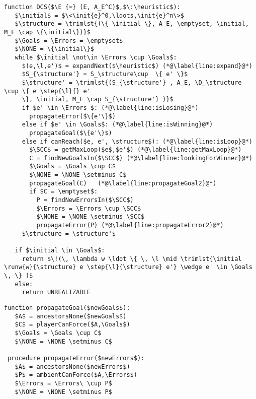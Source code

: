 \lstset{numbers=left, numberstyle=\tiny, stepnumber=1, numbersep=5pt}
\begin{lstlisting}[language={pseudocode},label={lst:dcs},caption={On-the-fly Directed Exploration Procedure.},float=ht]
 function DCS($\E {=} (E, A_E^C)$,$\:\heuristic$):
   $\initial$ = $\<\init{e}^0,\ldots,\init{e}^n\>$
   $\structure = \trimlst{(\{ \initial \}, A_E, \emptyset, \initial, M_E \cap \{\initial\})}$
   $\Goals = \Errors = \emptyset$
   $\NONE = \{\initial\}$
   while $\initial \not\in \Errors \cup \Goals$:
     $(e,\l,e')$ = expandNext($\heuristic$) (*@\label{line:expand}@*)
     $S_{\structure'} = S_\structure\cup  \{ e' \}$
     $\structure' = \trimlst{(S_{\structure'} , A_E, \D_\structure \cup \{ e \step{\l}{} e' 
     \}, \initial, M_E \cap S_{\structure'} )}$
     if $e' \in \Errors $: (*@\label{line:isLosing}@*)
       propagateError($\{e'\}$)
     else if $e' \in \Goals$: (*@\label{line:isWinning}@*)
       propagateGoal($\{e'\}$)
     else if canReach($e, e', \structure$): (*@\label{line:isLoop}@*)
       $\SCC$ = getMaxLoop($e$,$e'$) (*@\label{line:getMaxLoop}@*)
       C = findNewGoalsIn($\SCC$) (*@\label{line:lookingForWinner}@*)
       $\Goals = \Goals \cup C$
       $\NONE = \NONE \setminus C$
       propagateGoal(C)   (*@\label{line:propagateGoal2}@*)
       if $C = \emptyset$:
         P = findNewErrorsIn($\SCC$)
         $\Errors = \Errors \cup \SCC$
         $\NONE = \NONE \setminus \SCC$
         propagateError(P) (*@\label{line:propagateError2}@*)
     $\structure = \structure'$
 
   if $\initial \in \Goals$:
     return $\!(\, \lambda w \ldot \{ \, \l \mid \trimlst{\initial \runw{w}{\structure} e \step{\l}{\structure} e'} \wedge e' \in \Goals \, \} )$
   else:
     return UNREALIZABLE
\end{lstlisting}  

\lstset{numbers=none, numberstyle=\tiny, stepnumber=1, numbersep=5pt}
\begin{lstlisting}[language={pseudocode},label={lst:dcs.propagate},caption={Status propagation procedures.},float=ht]
 function propagateGoal($newGoals$):
   $A$ = ancestorsNone($newGoals$)
   $C$ = playerCanForce($A,\Goals$)
   $\Goals = \Goals \cup C$
   $\NONE = \NONE \setminus C$

 procedure propagateError($newErrors$):
   $A$ = ancestorsNone($newErrors$)
   $P$ = ambientCanForce($A,\Errors$)
   $\Errors = \Errors\ \cup P$
   $\NONE = \NONE \setminus P$
\end{lstlisting}



